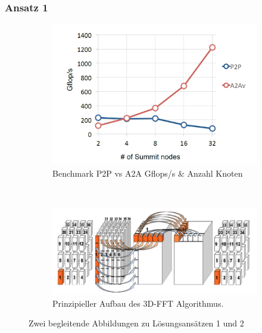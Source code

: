 \subsubsection{Ansatz 1}
\begin{figure}
	\begin{subfigure}[t]{0.5\textwidth}
		\centering
		\includegraphics[width=1\textwidth]{res/bench.png}
		\caption{\cite[Abb. 5]{mainpaper} Benchmark P2P vs A2A Gflops/s \& Anzahl Knoten}
		\label{fig:bench}
	\end{subfigure}
~
	\begin{subfigure}[t]{0.5\textwidth}
		\centering
		\includegraphics[width=1\textwidth]{res/algo.png}
		\caption{\cite[Abb. 2]{mainpaper} Prinzipieller Aufbau des 3D-FFT Algorithmus. }
		\label{fig:algo}
	\end{subfigure}
	\caption{Zwei begleitende Abbildungen zu Lösungsansätzen 1 und 2}
\end{figure}


